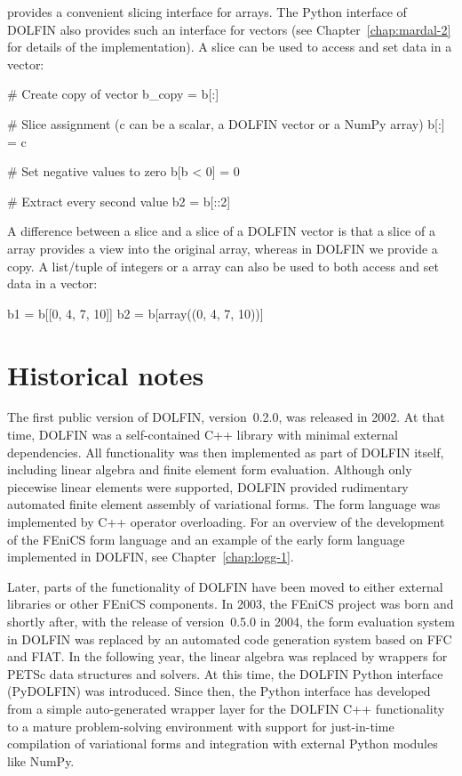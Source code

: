 \numpy provides a convenient slicing interface for \numpy arrays. The
Python interface of DOLFIN also provides such an interface for vectors
(see Chapter~\ref{chap:mardal-2} for details of the implementation). A
slice can be used to access and set data in a vector:
\begin{python}
# Create copy of vector
b_copy = b[:]

# Slice assignment (c can be a scalar, a DOLFIN vector or a NumPy array)
b[:] = c

# Set negative values to zero
b[b < 0] = 0

# Extract every second value
b2 = b[::2]
\end{python}
A difference between a \numpy slice and a slice of a DOLFIN vector is
that a slice of a \numpy array provides a view into the original array,
whereas in DOLFIN we provide a copy. A list/tuple of integers or a \numpy
array can also be used to both access and set data in a vector:
\begin{python}
b1 = b[[0, 4, 7, 10]]
b2 = b[array((0, 4, 7, 10))]
\end{python}

\section{Historical notes}

The first public version of DOLFIN, version~0.2.0, was released in
2002. At that time, DOLFIN was a self-contained C++ library with
minimal external dependencies. All functionality was then implemented
as part of DOLFIN itself, including linear algebra and finite element
form evaluation. Although only piecewise linear elements were
supported, DOLFIN provided rudimentary automated finite element
assembly of variational forms. The form language was implemented by
C++ operator overloading. For an overview of the development of the
FEniCS form language and an example of the early form language
implemented in DOLFIN, see Chapter~\ref{chap:logg-1}.

Later, parts of the functionality of DOLFIN have been moved to either
external libraries or other FEniCS components. In 2003, the FEniCS
project was born and shortly after, with the release of version~0.5.0 in
2004, the form evaluation system in DOLFIN was replaced by an automated
code generation system based on FFC and FIAT. In the following year,
the linear algebra was replaced by wrappers for PETSc data structures
and solvers. At this time, the DOLFIN Python interface ({Py}DOLFIN) was
introduced. Since then, the Python interface has developed from a simple
auto-generated wrapper layer for the DOLFIN C++ functionality to a mature
problem-solving environment with support for just-in-time compilation of
variational forms and integration with external Python modules like NumPy.


